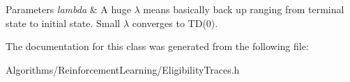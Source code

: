 \begin{DoxyParams}{Parameters}
{\em lambda} & A huge $\lambda$ means basically back up ranging from terminal state to initial state. Small $\lambda$ converges to T\-D(0). \\
\hline
\end{DoxyParams}


The documentation for this class was generated from the following file\-:\begin{DoxyCompactItemize}
\item 
Algorithms/\-Reinforcement\-Learning/Eligibility\-Traces.\-h\end{DoxyCompactItemize}
